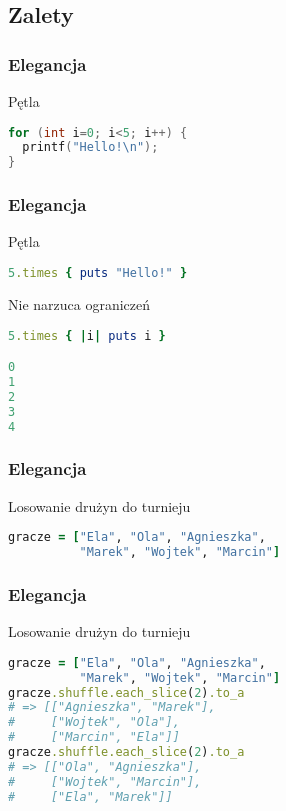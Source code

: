 \subsection{Zalety}


\begin{frame}[fragile]
\frametitle{Elegancja}
\begin{block}{Pętla}
\begin{lstlisting}[language=C]
for (int i=0; i<5; i++) {
  printf("Hello!\n");
}
\end{lstlisting}
\end{block}
\end{frame}


\begin{frame}[fragile]
\frametitle{Elegancja}
\begin{block}{Pętla}
\begin{lstlisting}[language=Ruby]
5.times { puts "Hello!" }
\end{lstlisting}
\end{block}
\begin{block}{Nie narzuca ograniczeń}
\begin{lstlisting}[language=Ruby]
5.times { |i| puts i }

0
1
2
3
4
\end{lstlisting}
\end{block}
\end{frame}


\begin{frame}[fragile]
\frametitle{Elegancja}
\begin{block}{Losowanie drużyn do turnieju}
\begin{lstlisting}[language=Ruby]
gracze = ["Ela", "Ola", "Agnieszka",
          "Marek", "Wojtek", "Marcin"]
\end{lstlisting}
\end{block}
\end{frame}
\begin{frame}[fragile]
\frametitle{Elegancja}
\begin{block}{Losowanie drużyn do turnieju}
\begin{lstlisting}[language=Ruby]
gracze = ["Ela", "Ola", "Agnieszka",
          "Marek", "Wojtek", "Marcin"]
gracze.shuffle.each_slice(2).to_a
# => [["Agnieszka", "Marek"],
#     ["Wojtek", "Ola"],
#     ["Marcin", "Ela"]]
gracze.shuffle.each_slice(2).to_a
# => [["Ola", "Agnieszka"],
#     ["Wojtek", "Marcin"],
#     ["Ela", "Marek"]]
\end{lstlisting}
\end{block}
\end{frame}

